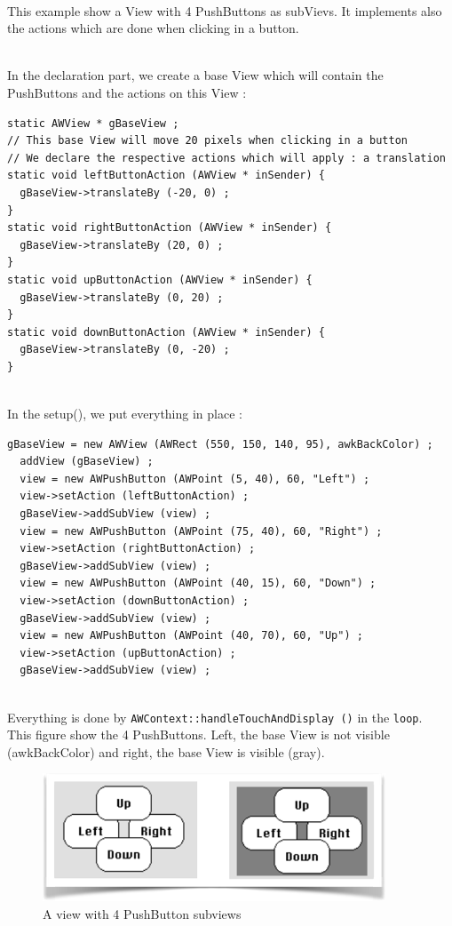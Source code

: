 \documentclass[a4paper,11pt]{extarticle}
\begin{document}
~\\ This example show a View with 4 PushButtons as subVievs. It implements also the actions which are done when clicking in a button.

~\\ In the declaration part, we create a base View which will contain the PushButtons and the actions on this View :
\begin{lstlisting}[language=Arduinonl]
static AWView * gBaseView ;
// This base View will move 20 pixels when clicking in a button
// We declare the respective actions which will apply : a translation
static void leftButtonAction (AWView * inSender) {
  gBaseView->translateBy (-20, 0) ;
}
static void rightButtonAction (AWView * inSender) {
  gBaseView->translateBy (20, 0) ;
}
static void upButtonAction (AWView * inSender) {
  gBaseView->translateBy (0, 20) ;
}
static void downButtonAction (AWView * inSender) {
  gBaseView->translateBy (0, -20) ;
}\end{lstlisting}

~\\ In the setup(), we put everything in place :
\begin{lstlisting}[language=Arduinonl]
  gBaseView = new AWView (AWRect (550, 150, 140, 95), awkBackColor) ;
  addView (gBaseView) ;
  view = new AWPushButton (AWPoint (5, 40), 60, "Left") ;
  view->setAction (leftButtonAction) ;
  gBaseView->addSubView (view) ;
  view = new AWPushButton (AWPoint (75, 40), 60, "Right") ;
  view->setAction (rightButtonAction) ;
  gBaseView->addSubView (view) ;
  view = new AWPushButton (AWPoint (40, 15), 60, "Down") ;
  view->setAction (downButtonAction) ;
  gBaseView->addSubView (view) ;
  view = new AWPushButton (AWPoint (40, 70), 60, "Up") ;
  view->setAction (upButtonAction) ;
  gBaseView->addSubView (view) ;
\end{lstlisting}

~\\ Everything is done by \texttt{AWContext::handleTouchAndDisplay ()} in the \texttt{loop}.
~\\ This figure show the 4 PushButtons. Left, the base View is not visible (awkBackColor) and right, the base View is visible (gray).

\begin{figure}[htbp]
   \centering
   \includegraphics[scale=0.7]{AWFig101.png} 
   \caption{A view with 4 PushButton subviews}
   \label{fig:101}
\end{figure}
\end{document}
